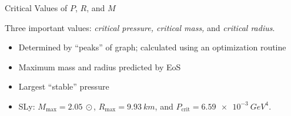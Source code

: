\documentclass[handout]{beamer}
\begin{document}
\begin{frame}{Critical Values of $P$, $R$, and $M$}
\begin{figure}[h!]
\begin{subfigure}{.5\textwidth}
            \end{subfigure}
        \end{figure} \pause
        Three important values: \pause \textit{critical pressure, critical mass,} and \textit{critical radius}. \pause 
        \begin{itemize}
            \item Determined by ``peaks'' of graph\pause ; calculated using an optimization routine \pause
            \item Maximum mass and radius predicted by EoS \pause
            \item Largest ``stable'' pressure \pause
            \item SLy: $M_\text{max} = \SI{2.05}{\odot}$, $R_\text{max} = \SI{9.93}{km}$, and $P_\text{crit} = \SI{6.59e-3}{GeV^4}$.
        \end{itemize}

    \end{frame}
\end{document}
